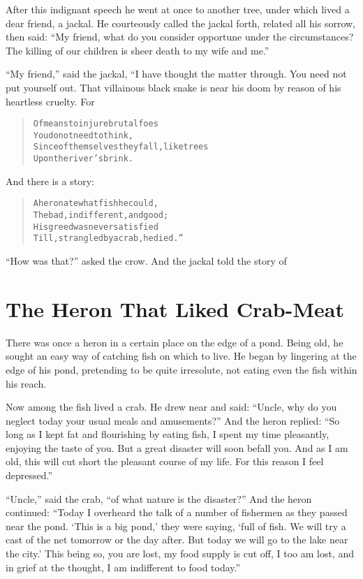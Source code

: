 \documentclass[article, twoside, 14pt]{memoir}
\renewenvironment{verbatim}{%
\begin{quote}%
\vskip -10pt%
\begin{alltt}\normalfont\large}{\end{alltt}%
\end{quote}%
\vskip -10pt
} %
\begin{document}
After this indignant speech he went at once to another tree, under
which lived a dear friend, a jackal. He courteously called the
jackal forth, related all his sorrow, then said:
``My friend, what do you consider opportune under the circumstances? The killing of our children is sheer death to my wife and me.''

``My friend,'' said the jackal, “I have thought the matter through.
You need not put yourself out. That villainous black snake is near
his doom by reason of his heartless cruelty. For

\begin{verbatim}
Of means to injure brutal foes
    You do not need to think,
Since of themselves they fall, like trees
    Upon the river's brink.
\end{verbatim}
And there is a story:

\begin{verbatim}
A heron ate what fish he could,
The bad, indifferent, and good;
His greed was never satisfied
Till, strangled by a crab, he died.”
\end{verbatim}
``How was that?'' asked the crow. And the jackal told the story of

\chapter{The Heron That Liked Crab-Meat}

\label{s9}

There was once a heron in a certain place on the edge of a pond.
Being old, he sought an easy way of catching fish on which to live.
He began by lingering at the edge of his pond, pretending to be
quite irresolute, not eating even the fish within his reach.

Now among the fish lived a crab. He drew near and said:
``Uncle, why do you neglect today your usual meals and amusements?''
And the heron replied:
``So long as I kept fat and flourishing by eating fish, I spent my time pleasantly, enjoying the taste of you. But a great disaster will soon befall you. And as I am old, this will cut short the pleasant course of my life. For this reason I feel depressed.''

``Uncle,'' said the crab, ``of what nature is the disaster?'' And
the heron continued:
``Today I overheard the talk of a number of fishermen as they passed near the pond. `This is a big pond,' they were saying, `full of fish. We will try a cast of the net tomorrow or the day after. But today we will go to the lake near the city.' This being so, you are lost, my food supply is cut off, I too am lost, and in grief at the thought, I am indifferent to food today.''
\end{document}
